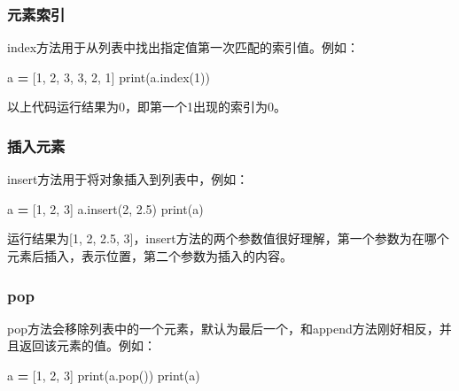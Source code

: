 \documentclass[]{ctexbook}
\newenvironment{Shaded}{\begin{snugshade}}{\end{snugshade}}
\newcommand{\BuiltInTok}[1]{#1}
\newcommand{\DecValTok}[1]{\textcolor[rgb]{0.00,0.00,0.81}{#1}}
\newcommand{\FloatTok}[1]{\textcolor[rgb]{0.00,0.00,0.81}{#1}}
\newcommand{\NormalTok}[1]{#1}
\newcommand{\OperatorTok}[1]{\textcolor[rgb]{0.81,0.36,0.00}{\textbf{#1}}}
\begin{document}
\hypertarget{ux5143ux7d20ux7d22ux5f15}{%
\subsubsection{元素索引}\label{ux5143ux7d20ux7d22ux5f15}}

index方法用于从列表中找出指定值第一次匹配的索引值。例如：

\begin{Shaded}
\begin{Highlighting}[]
\NormalTok{a }\OperatorTok{=}\NormalTok{ [}\DecValTok{1}\NormalTok{, }\DecValTok{2}\NormalTok{, }\DecValTok{3}\NormalTok{, }\DecValTok{3}\NormalTok{, }\DecValTok{2}\NormalTok{, }\DecValTok{1}\NormalTok{]}
\BuiltInTok{print}\NormalTok{(a.index(}\DecValTok{1}\NormalTok{))}
\end{Highlighting}
\end{Shaded}

以上代码运行结果为0，即第一个1出现的索引为0。

\hypertarget{ux63d2ux5165ux5143ux7d20}{%
\subsubsection{插入元素}\label{ux63d2ux5165ux5143ux7d20}}

insert方法用于将对象插入到列表中，例如：

\begin{Shaded}
\begin{Highlighting}[]
\NormalTok{a }\OperatorTok{=}\NormalTok{ [}\DecValTok{1}\NormalTok{, }\DecValTok{2}\NormalTok{, }\DecValTok{3}\NormalTok{]}
\NormalTok{a.insert(}\DecValTok{2}\NormalTok{, }\FloatTok{2.5}\NormalTok{)}
\BuiltInTok{print}\NormalTok{(a)}
\end{Highlighting}
\end{Shaded}

运行结果为{[}1, 2, 2.5, 3{]}，insert方法的两个参数值很好理解，第一个参数为在哪个元素后插入，表示位置，第二个参数为插入的内容。

\hypertarget{pop}{%
\subsubsection{pop}\label{pop}}

pop方法会移除列表中的一个元素，默认为最后一个，和append方法刚好相反，并且返回该元素的值。例如：

\begin{Shaded}
\begin{Highlighting}[]
\NormalTok{a }\OperatorTok{=}\NormalTok{ [}\DecValTok{1}\NormalTok{, }\DecValTok{2}\NormalTok{, }\DecValTok{3}\NormalTok{]}
\BuiltInTok{print}\NormalTok{(a.pop())}
\BuiltInTok{print}\NormalTok{(a)}
\end{Highlighting}
\end{Shaded}
\end{document}
